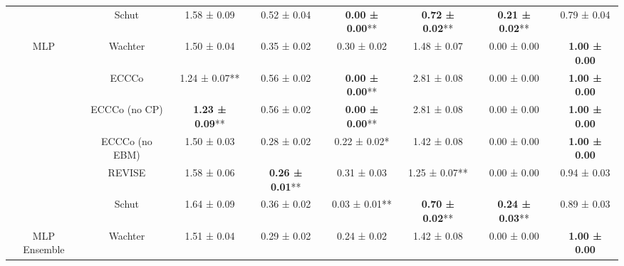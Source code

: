 \begin{table}
{\begin{tabular}[t]{cccccccc}
 & Schut & 1.58 ± 0.09\hphantom{*}\hphantom{*} & 0.52 ± 0.04\hphantom{*}\hphantom{*} & \textbf{0.00 ± 0.00}** & \textbf{0.72 ± 0.02}** & \textbf{0.21 ± 0.02}** & 0.79 ± 0.04\hphantom{*}\hphantom{*}\\

\multirow[t]{-6}{*}{\centering\arraybackslash MLP} & Wachter & 1.50 ± 0.04\hphantom{*}\hphantom{*} & 0.35 ± 0.02\hphantom{*}\hphantom{*} & 0.30 ± 0.02\hphantom{*}\hphantom{*} & 1.48 ± 0.07\hphantom{*}\hphantom{*} & 0.00 ± 0.00\hphantom{*}\hphantom{*} & \textbf{1.00 ± 0.00}\hphantom{*}\hphantom{*}\\
\cmidrule{1-8}
 & ECCCo & 1.24 ± 0.07** & 0.56 ± 0.02\hphantom{*}\hphantom{*} & \textbf{0.00 ± 0.00}** & 2.81 ± 0.08\hphantom{*}\hphantom{*} & 0.00 ± 0.00\hphantom{*}\hphantom{*} & \textbf{1.00 ± 0.00}\hphantom{*}\hphantom{*}\\

 & ECCCo (no CP) & \textbf{1.23 ± 0.09}** & 0.56 ± 0.02\hphantom{*}\hphantom{*} & \textbf{0.00 ± 0.00}** & 2.81 ± 0.08\hphantom{*}\hphantom{*} & 0.00 ± 0.00\hphantom{*}\hphantom{*} & \textbf{1.00 ± 0.00}\hphantom{*}\hphantom{*}\\

 & ECCCo (no EBM) & 1.50 ± 0.03\hphantom{*}\hphantom{*} & 0.28 ± 0.02\hphantom{*}\hphantom{*} & 0.22 ± 0.02*\hphantom{*} & 1.42 ± 0.08\hphantom{*}\hphantom{*} & 0.00 ± 0.00\hphantom{*}\hphantom{*} & \textbf{1.00 ± 0.00}\hphantom{*}\hphantom{*}\\

 & REVISE & 1.58 ± 0.06\hphantom{*}\hphantom{*} & \textbf{0.26 ± 0.01}** & 0.31 ± 0.03\hphantom{*}\hphantom{*} & 1.25 ± 0.07** & 0.00 ± 0.00\hphantom{*}\hphantom{*} & 0.94 ± 0.03\hphantom{*}\hphantom{*}\\

 & Schut & 1.64 ± 0.09\hphantom{*}\hphantom{*} & 0.36 ± 0.02\hphantom{*}\hphantom{*} & 0.03 ± 0.01** & \textbf{0.70 ± 0.02}** & \textbf{0.24 ± 0.03}** & 0.89 ± 0.03\hphantom{*}\hphantom{*}\\

\multirow[t]{-6}{*}{\centering\arraybackslash MLP Ensemble} & Wachter & 1.51 ± 0.04\hphantom{*}\hphantom{*} & 0.29 ± 0.02\hphantom{*}\hphantom{*} & 0.24 ± 0.02\hphantom{*}\hphantom{*} & 1.42 ± 0.08\hphantom{*}\hphantom{*} & 0.00 ± 0.00\hphantom{*}\hphantom{*} & \textbf{1.00 ± 0.00}\hphantom{*}\hphantom{*}\\
\bottomrule
\end{tabular}}
\end{table}
